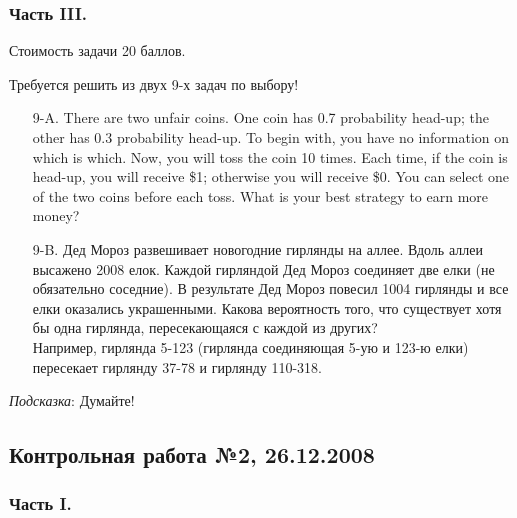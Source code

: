 \documentclass[12pt, a4paper]{article}\usepackage[]{graphicx}\usepackage[]{color}
\begin{document}
\subsubsection*{Часть III.}

Стоимость задачи 20 баллов.

Требуется решить \textbf{} из двух 9-х задач по
выбору!

\begin{enumerate}
\item[9-A.] There are two unfair coins. One coin has 0.7 probability head-up; the other has 0.3 probability head-up. To begin with, you have no information on which is which. Now, you will toss the coin 10 times. Each time, if the coin is head-up, you will receive \$1; otherwise you will receive \$0. You can select one of the two coins before each toss. What is your best strategy to earn more money?
\item[9-B.] Дед Мороз развешивает новогодние гирлянды на аллее. Вдоль аллеи высажено 2008 елок. Каждой гирляндой Дед Мороз соединяет две елки (не обязательно соседние). В результате Дед Мороз повесил 1004 гирлянды и все елки оказались украшенными. Какова вероятность того, что существует хотя бы одна гирлянда, пересекающаяся с каждой из других? \\
Например, гирлянда 5-123 (гирлянда соединяющая 5-ую и 123-ю елки) пересекает гирлянду 37-78 и гирлянду 110-318.
\end{enumerate}
\emph{Подсказка}: Думайте!

\subsection{Контрольная работа №2, 26.12.2008}

\subsubsection*{Часть I.}
\end{document}
